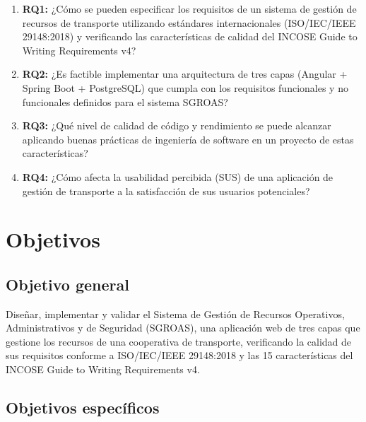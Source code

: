 \begin{enumerate}
  \item \textbf{RQ1:} ¿Cómo se pueden especificar los requisitos de un sistema de gestión de recursos de transporte utilizando estándares internacionales (ISO/IEC/IEEE 29148:2018) y verificando las características de calidad del INCOSE Guide to Writing Requirements v4?

  \item \textbf{RQ2:} ¿Es factible implementar una arquitectura de tres capas (Angular + Spring Boot + PostgreSQL) que cumpla con los requisitos funcionales y no funcionales definidos para el sistema SGROAS?

  \item \textbf{RQ3:} ¿Qué nivel de calidad de código y rendimiento se puede alcanzar aplicando buenas prácticas de ingeniería de software en un proyecto de estas características?

  \item \textbf{RQ4:} ¿Cómo afecta la usabilidad percibida (SUS) de una aplicación de gestión de transporte a la satisfacción de sus usuarios potenciales?
\end{enumerate}

\section{Objetivos}
\label{sec:objetivos}

\subsection{Objetivo general}

Diseñar, implementar y validar el Sistema de Gestión de Recursos Operativos, Administrativos y de Seguridad (SGROAS), una aplicación web de tres capas que gestione los recursos de una cooperativa de transporte, verificando la calidad de sus requisitos conforme a ISO/IEC/IEEE 29148:2018 y las 15 características del INCOSE Guide to Writing Requirements v4.

\subsection{Objetivos específicos}

